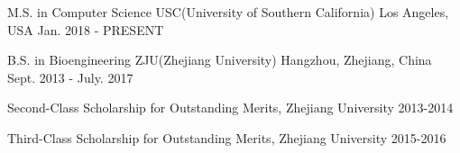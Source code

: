 


\begin{cventries}

\cventry
{M.S. in Computer Science} %
{USC(University of Southern California)} %
{Los Angeles, USA} %
{Jan. 2018 - PRESENT} %
{%
\begin{cvitems}
\end{cvitems}
}

\cventry
{B.S. in Bioengineering} %
{ZJU(Zhejiang University)} %
{Hangzhou, Zhejiang, China} %
{Sept. 2013 - July. 2017} %
{ %
\begin{cvitems}
\item {Second-Class Scholarship for Outstanding Merits, Zhejiang University    2013-2014}
\item {Third-Class Scholarship for Outstanding Merits, Zhejiang University    2015-2016}
\end{cvitems}
}

\end{cventries}